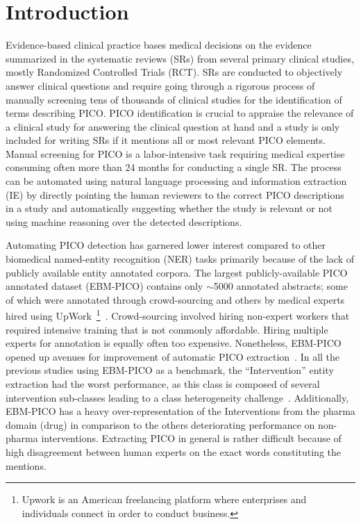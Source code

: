 \documentclass[letterpaper]{article} %
\begin{document}
\section{Introduction}
\label{sec:intro}
%
Evidence-based clinical practice bases medical decisions on the evidence summarized in the systematic reviews (SRs) from several primary clinical studies, mostly Randomized Controlled Trials (RCT).
SRs are conducted to objectively answer clinical questions and require going through a rigorous process of manually screening tens of thousands of clinical studies for the identification of terms describing PICO.
PICO identification is crucial to appraise the relevance of a clinical study for answering the clinical question at hand and a study is only included for writing SRs if it mentions all or most relevant PICO elements.
Manual screening for PICO is a labor-intensive task requiring medical expertise consuming often more than 24 months for conducting a single SR.
The process can be automated using natural language processing and information extraction (IE) by directly pointing the human reviewers to the correct PICO descriptions in a study and automatically suggesting whether the study is relevant or not using machine reasoning over the detected descriptions.

Automating PICO detection has garnered lower interest compared to other biomedical named-entity recognition (NER) tasks primarily because of the lack of publicly available entity annotated corpora.
The largest publicly-available PICO annotated dataset (EBM-PICO) contains only $\sim$5000 annotated abstracts; some of which were annotated through crowd-sourcing and others by medical experts hired using UpWork~\footnote{Upwork is an American freelancing platform where enterprises and individuals connect in order to conduct business.}~\cite{nye2018corpus}.
Crowd-sourcing involved hiring non-expert workers that required intensive training that is not commonly affordable.
Hiring multiple experts for annotation is equally often too expensive.
Nonetheless, EBM-PICO opened up avenues for improvement of automatic PICO extraction~\cite{gu2020domain}.
In all the previous studies using EBM-PICO as a benchmark, the ``Intervention'' entity extraction had the worst performance, as this class is composed of several intervention sub-classes leading to a class heterogeneity challenge~\cite{jaseena2014issues, cardellino2017low}.
Additionally, EBM-PICO has a heavy over-representation of the Interventions from the pharma domain (drug) in comparison to the others deteriorating performance on non-pharma interventions.
Extracting PICO in general is rather difficult because of high disagreement between human experts on the exact words constituting the mentions.
\end{document}
